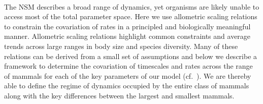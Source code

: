 \documentclass{pnastwo}
\begin{document}
\begin{article}
%



 \\ 
The NSM describes a broad range of dynamics, yet organisms are likely unable
to access most of the total parameter space. Here we use allometric scaling
relations to constrain the covariation of rates in a principled and
biologically meaningful manner.  Allometric scaling relations highlight
common constraints and average trends across large ranges in body size and
species diversity. Many of these relations can be derived from a small set of
assumptions and below we describe a framework to determine the covariation of
timescales and rates across the range of mammals for each of the key
parameters of our model (cf.~\cite{Yodzis:1992hg}).  We are thereby able to
define the regime of dynamics occupied by the entire class of mammals along
with the key differences between the largest and smallest mammals.



\end{article}
\end{document}

